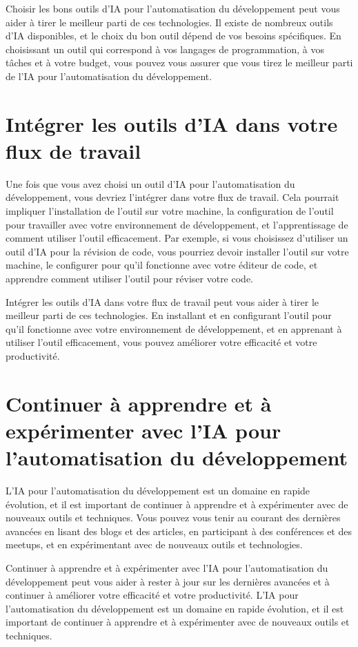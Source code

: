 Choisir les bons outils d'IA pour l'automatisation du développement peut vous aider à tirer le meilleur parti de ces technologies. Il existe de nombreux outils d'IA disponibles, et le choix du bon outil dépend de vos besoins spécifiques. En choisissant un outil qui correspond à vos langages de programmation, à vos tâches et à votre budget, vous pouvez vous assurer que vous tirez le meilleur parti de l'IA pour l'automatisation du développement.

\section{Intégrer les outils d'IA dans votre flux de travail}

Une fois que vous avez choisi un outil d'IA pour l'automatisation du développement, vous devriez l'intégrer dans votre flux de travail. Cela pourrait impliquer l'installation de l'outil sur votre machine, la configuration de l'outil pour travailler avec votre environnement de développement, et l'apprentissage de comment utiliser l'outil efficacement. Par exemple, si vous choisissez d'utiliser un outil d'IA pour la révision de code, vous pourriez devoir installer l'outil sur votre machine, le configurer pour qu'il fonctionne avec votre éditeur de code, et apprendre comment utiliser l'outil pour réviser votre code.

Intégrer les outils d'IA dans votre flux de travail peut vous aider à tirer le meilleur parti de ces technologies. En installant et en configurant l'outil pour qu'il fonctionne avec votre environnement de développement, et en apprenant à utiliser l'outil efficacement, vous pouvez améliorer votre efficacité et votre productivité.

\section{Continuer à apprendre et à expérimenter avec l'IA pour l'automatisation du développement}

L'IA pour l'automatisation du développement est un domaine en rapide évolution, et il est important de continuer à apprendre et à expérimenter avec de nouveaux outils et techniques. Vous pouvez vous tenir au courant des dernières avancées en lisant des blogs et des articles, en participant à des conférences et des meetups, et en expérimentant avec de nouveaux outils et technologies.

Continuer à apprendre et à expérimenter avec l'IA pour l'automatisation du développement peut vous aider à rester à jour sur les dernières avancées et à continuer à améliorer votre efficacité et votre productivité. L'IA pour l'automatisation du développement est un domaine en rapide évolution, et il est important de continuer à apprendre et à expérimenter avec de nouveaux outils et techniques.

